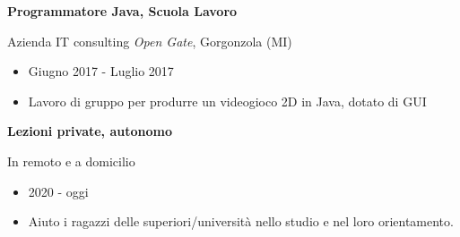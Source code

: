 \documentclass[a4paper]{letter}
\begin{document}
\begin{minipage}[t]{0.65\textwidth}
\vspace{0.15cm}

\makeatletter
\newcommand{\EsperienzaBox}{%
}
\makeatother

\EsperienzaBox

\vspace{0.8 cm}

{\large \textbf{Programmatore Java, Scuola Lavoro}}

{\small  Azienda IT consulting \textit{Open Gate}, Gorgonzola (MI)}

\begin{itemize}
    \item Giugno 2017 - Luglio 2017
    \item Lavoro di gruppo per produrre un videogioco 2D in Java, dotato di GUI
\end{itemize}

{\large \textbf{Lezioni private, autonomo}}

{\small In remoto e a domicilio}

\begin{itemize}
    \item 2020 - oggi
    \item Aiuto i ragazzi delle superiori/università nello studio e nel loro orientamento.
\end{itemize}

\end{minipage}
\end{document}
